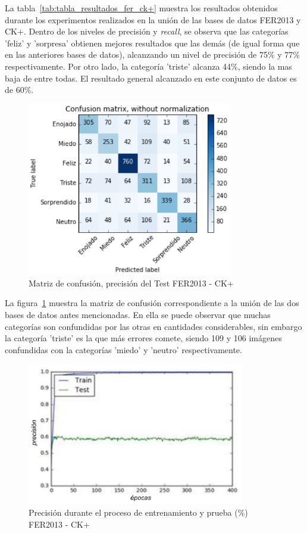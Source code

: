 La tabla~\ref{tab:tabla_resultados_fer_ck+} muestra los resultados obtenidos durante los experimentos realizados en la unión de las bases de datos FER2013 y CK+. Dentro de los niveles de precisión y \textit{recall}, se observa que las categorías 'feliz' y 'sorpresa' obtienen mejores resultados que las demás (de igual forma que en las anteriores bases de datos), alcanzando un nivel de precisión de 75\% y 77\% respectivamente. Por otro lado, la categoría 'triste' alcanza 44\%, siendo la mas baja de entre todas. El resultado general alcanzado en este conjunto de datos es de 60\%.

\begin{figure}[H]
		\centering
		\includegraphics[width=90mm]{Imagenes/matriz_confusion_fer_ck+.png}
		\caption{Matriz de confusión, precisión del Test FER2013 - CK+}
		\label{fig:matriz_confusion_fer_ck+}
\end{figure}

La figura~\ref{fig:matriz_confusion_fer_ck+} muestra la matriz de confusión correspondiente a la unión de las dos bases de datos antes mencionadas. En ella se puede observar que muchas categorías son confundidas por las otras en cantidades considerables, sin embargo la categoría 'triste' es la que más errores comete, siendo 109 y 106 imágenes confundidas con la categorías 'miedo' y 'neutro' respectivamente. 
  
\begin{figure}[H]
		\centering
		\includegraphics[width=95mm]{Imagenes/precision_fer_ck+.pdf}
		\caption{Precisión durante el proceso de entrenamiento y prueba (\%) FER2013 - CK+}
		\label{fig:precision_fer_ck+}
\end{figure}

